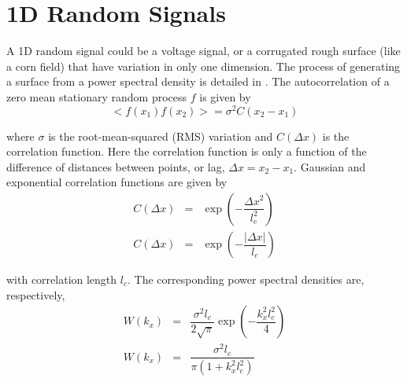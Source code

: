 \section{1D Random Signals}
\label{sec:1drandom}
A 1D random signal could be a voltage signal, or a corrugated rough surface (like a corn field) that have variation in only one dimension. The process of generating a surface from a power spectral density is detailed in \cite{mack2013generating,tsang2000scattering2}.  The autocorrelation of a zero mean stationary random process $f$ is given by 
\begin{equation}
< f(x_1) f(x_2) > = \sigma^2 C(x_2-x_1)
\end{equation}

\noindent where $\sigma$ is the root-mean-squared (RMS) variation and $C(\Delta x)$ is the correlation function. Here the  correlation function is only a function of the difference of distances between points, or lag, $\Delta x = x_2-x_1$. Gaussian and exponential correlation functions are given by
\begin{eqnarray}
C(\Delta x) &=& \exp\left(-\dfrac{\Delta x^2}{l_c^2}\right) \\
C(\Delta x) &=& \exp\left(-\dfrac{\vert \Delta x \vert}{l_c}\right) 
\end{eqnarray}

with correlation length $l_c$. The corresponding power spectral densities are, respectively, 
\begin{eqnarray}
W(k_x) &=& \dfrac{\sigma^2 l_c}{2\sqrt{\pi}}\exp\left(-\dfrac{k_x^2 l_c^2}{4}\right)\\
W(k_x) &=& \dfrac{\sigma^2 l_c}{\pi\left(1+k_x^2l_c^2\right)} 
\end{eqnarray}


